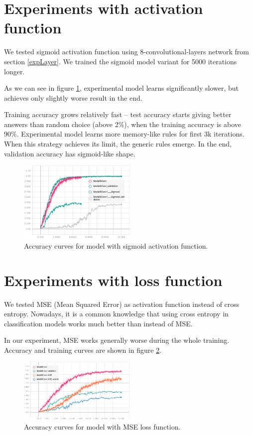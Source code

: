 \documentclass[a4paper]{article}
\begin{document}
\section{Experiments with activation function}

We tested sigmoid activation function using 8-convolutional-layers network from section \ref{expLayer}.
We trained the sigmoid model variant for 5000 iterations longer.

As we can see in figure \ref{fig:sigmoid}, experimental model learns significantly slower,
but achieves only slightly worse result in the end.

Training accuracy grows relatively fast -- test accuracy
starts giving better answers than random choice (above 2\%),
when the training accuracy is above 90\%.
Experimental model learns more memory-like rules for first 3k iterations.
When this strategy achieves its limit, the generic rules emerge.
In the end, validation accuracy has sigmoid-like shape.



\begin{figure}[!h]
    \centering
    \includegraphics[page=2,width=0.5\textwidth]{sigmoidConv.png}
    \caption[]{Accuracy curves for model with sigmoid activation function.
    \label{fig:sigmoid}
    }
\end{figure}


\section{Experiments with loss function}

We tested MSE (Mean Squared Error) as activation function instead of cross entropy.
Nowadays, it is a common knowledge that using cross entropy in classification models works much better than instead of
MSE.

In our experiment, MSE works generally worse during the whole training. Accuracy and training curves are shown in figure \ref{fig:mse}.

\begin{figure}[!h]
    \centering
    \includegraphics[page=2,width=0.5\textwidth]{sqrLoss.png}
    \caption[]{Accuracy curves for model with MSE loss function.
    \label{fig:mse}
    }
\end{figure}
\end{document}
